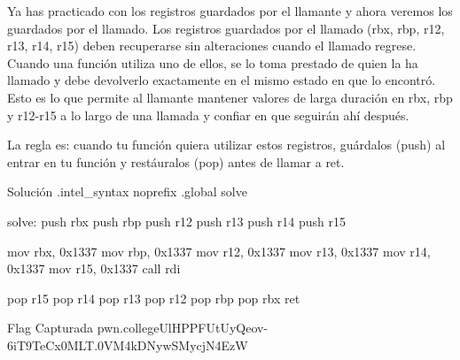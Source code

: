 Ya has practicado con los registros guardados por el llamante y ahora veremos los guardados por el llamado. Los registros guardados por el llamado (rbx, rbp, r12, r13, r14, r15) deben recuperarse sin alteraciones cuando el llamado regrese. Cuando una función utiliza uno de ellos, se lo toma prestado de quien la ha llamado y debe devolverlo exactamente en el mismo estado en que lo encontró. Esto es lo que permite al llamante mantener valores de larga duración en rbx, rbp y r12-r15 a lo largo de una llamada y confiar en que seguirán ahí después.

La regla es: cuando tu función quiera utilizar estos registros, guárdalos (push) al entrar en tu función y restáuralos (pop) antes de llamar a ret.

\begin{codebox}[ASM]{Solución}
	.intel_syntax noprefix
	.global solve

	solve:
	push rbx
	push rbp
	push r12
	push r13
	push r14
	push r15

	mov rbx, 0x1337
	mov rbp, 0x1337
	mov r12, 0x1337
	mov r13, 0x1337
	mov r14, 0x1337
	mov r15, 0x1337
	call rdi

	pop r15
	pop r14
	pop r13
	pop r12
	pop rbp
	pop rbx
	ret
\end{codebox}

\begin{flagbox}{Flag Capturada}
	pwn.college{UlHPPFUtUyQeov-6iT9TeCx0MLT.0VM4kDNywSMycjN4EzW}
\end{flagbox}

